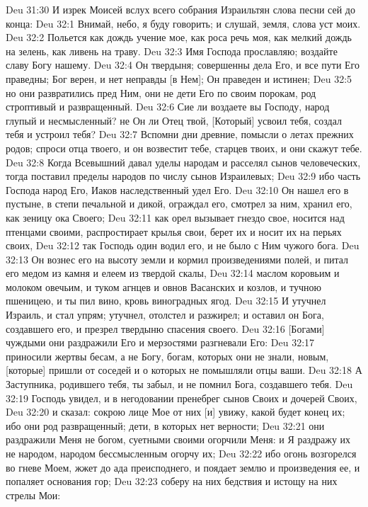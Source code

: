 Deu 31:30  И изрек Моисей вслух всего собрания Израильтян слова песни сей до конца:
Deu 32:1  Внимай, небо, я буду говорить; и слушай, земля, слова уст моих.
Deu 32:2  Польется как дождь учение мое, как роса речь моя, как мелкий дождь на зелень, как ливень на траву.
Deu 32:3  Имя Господа прославляю; воздайте славу Богу нашему.
Deu 32:4  Он твердыня; совершенны дела Его, и все пути Его праведны; Бог верен, и нет неправды [в Нем]; Он праведен и истинен;
Deu 32:5  но они развратились пред Ним, они не дети Его по своим порокам, род строптивый и развращенный.
Deu 32:6  Сие ли воздаете вы Господу, народ глупый и несмысленный? не Он ли Отец твой, [Который] усвоил тебя, создал тебя и устроил тебя?
Deu 32:7  Вспомни дни древние, помысли о летах прежних родов; спроси отца твоего, и он возвестит тебе, старцев твоих, и они скажут тебе.
Deu 32:8  Когда Всевышний давал уделы народам и расселял сынов человеческих, тогда поставил пределы народов по числу сынов Израилевых;
Deu 32:9  ибо часть Господа народ Его, Иаков наследственный удел Его.
Deu 32:10  Он нашел его в пустыне, в степи печальной и дикой, ограждал его, смотрел за ним, хранил его, как зеницу ока Своего;
Deu 32:11  как орел вызывает гнездо свое, носится над птенцами своими, распростирает крылья свои, берет их и носит их на перьях своих,
Deu 32:12  так Господь один водил его, и не было с Ним чужого бога.
Deu 32:13  Он вознес его на высоту земли и кормил произведениями полей, и питал его медом из камня и елеем из твердой скалы,
Deu 32:14  маслом коровьим и молоком овечьим, и туком агнцев и овнов Васанских и козлов, и тучною пшеницею, и ты пил вино, кровь виноградных ягод.
Deu 32:15  И утучнел Израиль, и стал упрям; утучнел, отолстел и разжирел; и оставил он Бога, создавшего его, и презрел твердыню спасения своего.
Deu 32:16  [Богами] чуждыми они раздражили Его и мерзостями разгневали Его:
Deu 32:17  приносили жертвы бесам, а не Богу, богам, которых они не знали, новым, [которые] пришли от соседей и о которых не помышляли отцы ваши.
Deu 32:18  А Заступника, родившего тебя, ты забыл, и не помнил Бога, создавшего тебя.
Deu 32:19  Господь увидел, и в негодовании пренебрег сынов Своих и дочерей Своих,
Deu 32:20  и сказал: сокрою лице Мое от них [и] увижу, какой будет конец их; ибо они род развращенный; дети, в которых нет верности;
Deu 32:21  они раздражили Меня не богом, суетными своими огорчили Меня: и Я раздражу их не народом, народом бессмысленным огорчу их;
Deu 32:22  ибо огонь возгорелся во гневе Моем, жжет до ада преисподнего, и поядает землю и произведения ее, и попаляет основания гор;
Deu 32:23  соберу на них бедствия и истощу на них стрелы Мои:
